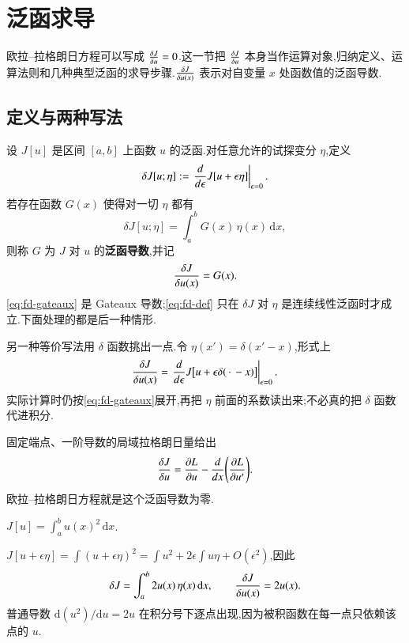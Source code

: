 \section{泛函求导}
\label{sec:functional-derivative}
欧拉--拉格朗日方程可以写成 $\frac{\delta {J}}{\delta {u}}=0$.这一节把 $\frac{\delta {J}}{\delta {u}}$ 本身当作运算对象,归纳定义、运算法则和几种典型泛函的求导步骤.$\frac{\delta {J}}{\delta {u(x)}}$ 表示对自变量 $x$ 处函数值的泛函导数.

\subsection{定义与两种写法}
设 $J[u]$ 是区间 $[a,b]$ 上函数 $u$ 的泛函.对任意允许的试探变分 $\eta$,定义
\begin{equation}
  \delta J[u;\eta]
  :=\left.\frac{d{}}{d{\epsilon}}J[u+\epsilon\eta]\right|_{\epsilon=0}.
  \label{eq:fd-gateaux}
\end{equation}
若存在函数 $G(x)$ 使得对一切 $\eta$ 都有
\begin{equation}
  \delta J[u;\eta]=\int_a^b G(x)\,\eta(x)\,\mathrm{d}x,
  \label{eq:fd-def}
\end{equation}
则称 $G$ 为 $J$ 对 $u$ 的\textbf{泛函导数},并记
\begin{equation}
  \frac{\delta {J}}{\delta {u(x)}}=G(x).
\end{equation}
\eqref{eq:fd-gateaux} 是 Gateaux 导数;\eqref{eq:fd-def} 只在 $\delta J$ 对 $\eta$ 是连续线性泛函时才成立.下面处理的都是后一种情形.

另一种等价写法用 $\delta$ 函数挑出一点.令 $\eta(x')=\delta(x'-x)$,形式上
\begin{equation}
  \frac{\delta {J}}{\delta {u(x)}}
  =\left.\frac{d{}}{d{\epsilon}}J\bigl[u+\epsilon\delta(\,\cdot\,-x)\bigr]\right|_{\epsilon=0}.
  \label{eq:fd-delta}
\end{equation}
实际计算时仍按\eqref{eq:fd-gateaux}展开,再把 $\eta$ 前面的系数读出来;不必真的把 $\delta$ 函数代进积分.

固定端点、一阶导数的局域拉格朗日量给出
\begin{equation}
  \frac{\delta {J}}{\delta {u}}
  =\frac{\partial{L}}{\partial{u}}-\frac{d{}}{d{x}}\Biggl(\frac{\partial{L}}{\partial{u'}}\Biggr).
\end{equation}
欧拉--拉格朗日方程就是这个泛函导数为零.

\begin{example}
$J[u]=\int_a^b u(x)^2\,\mathrm{d}x$.
\end{example}
\begin{solution}
$J[u+\epsilon\eta]=\int(u+\epsilon\eta)^2=\int u^2+2\epsilon\int u\eta+O(\epsilon^2)$,因此
\begin{equation}
  \delta J=\int_a^b 2u(x)\,\eta(x)\,\mathrm{d}x,
  \qquad
  \frac{\delta {J}}{\delta {u(x)}}=2u(x).
\end{equation}
普通导数 $\mathrm{d}(u^2)/\mathrm{d}u=2u$ 在积分号下逐点出现,因为被积函数在每一点只依赖该点的 $u$.
\end{solution}

